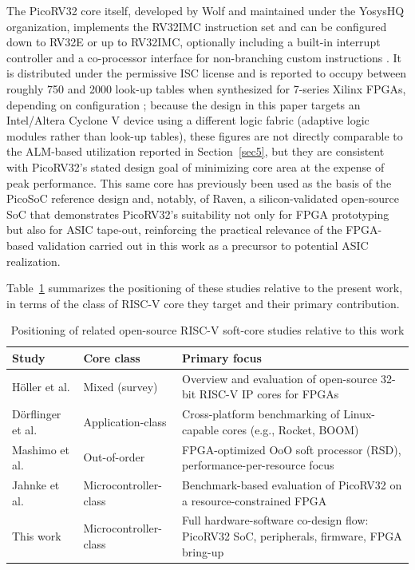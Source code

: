 \documentclass[runningheads]{llncs}
\begin{document}
The PicoRV32 core itself, developed by Wolf and maintained under the YosysHQ organization, implements the RV32IMC instruction set and can be configured down to RV32E or up to RV32IMC, optionally including a built-in interrupt controller and a co-processor interface for non-branching custom instructions \cite{wolf2019picorv32}. It is distributed under the permissive ISC license and is reported to occupy between roughly 750 and 2000 look-up tables when synthesized for 7-series Xilinx FPGAs, depending on configuration \cite{wolf2019picorv32}; because the design in this paper targets an Intel/Altera Cyclone V device using a different logic fabric (adaptive logic modules rather than look-up tables), these figures are not directly comparable to the ALM-based utilization reported in Section~\ref{sec5}, but they are consistent with PicoRV32's stated design goal of minimizing core area at the expense of peak performance. This same core has previously been used as the basis of the PicoSoC reference design and, notably, of Raven, a silicon-validated open-source SoC that demonstrates PicoRV32's suitability not only for FPGA prototyping but also for ASIC tape-out, reinforcing the practical relevance of the FPGA-based validation carried out in this work as a precursor to potential ASIC realization.

Table~\ref{tab:related} summarizes the positioning of these studies relative to the present work, in terms of the class of RISC-V core they target and their primary contribution.

\begin{table}[htbp]
\centering
\caption{Positioning of related open-source RISC-V soft-core studies relative to this work}
\label{tab:related}
\begin{tabular}{@{}p{2.6cm}p{2.0cm}p{5.7cm}@{}}
\toprule
\textbf{Study} & \textbf{Core class} & \textbf{Primary focus} \\
\midrule
H{\"o}ller et al. \cite{holler2019opensource} & Mixed (survey) & Overview and evaluation of open-source 32-bit RISC-V IP cores for FPGAs \\
D{\"o}rflinger et al. \cite{dorflinger2021comparative} & Application-class & Cross-platform benchmarking of Linux-capable cores (e.g., Rocket, BOOM) \\
Mashimo et al. \cite{mashimo2019opensource} & Out-of-order & FPGA-optimized OoO soft processor (RSD), performance-per-resource focus \\
Jahnke et al. \cite{jahnke2023performance} & Microcontroller-class & Benchmark-based evaluation of PicoRV32 on a resource-constrained FPGA \\
This work & Microcontroller-class & Full hardware-software co-design flow: PicoRV32 SoC, peripherals, firmware, FPGA bring-up \\
\bottomrule
\end{tabular}
\end{table}
\end{document}
